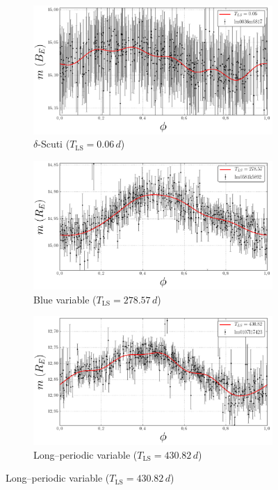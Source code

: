 \begin{figure}[H]
\begin{subfigure}[t]{0.49\textwidth}
	\end{subfigure}
	\begin{subfigure}[t]{0.49\textwidth}
		\centering
		\caption{$\delta$-Scuti ($T_{\text{LS}} = 0.06 \, \unit{d}$)}
		\label{fig:lightcurve-dsct}
		\includegraphics[width=\textwidth]{figures/lightcurves/dsct.png}		
	\end{subfigure}
	\begin{subfigure}[t]{0.49\textwidth}
		\centering
		\caption{Blue variable ($T_{\text{LS}} = 278.57 \, \unit{d}$)}
		\label{fig:lightcurve-bv}
		\includegraphics[width=\textwidth]{figures/lightcurves/bv.png}		
	\end{subfigure}
	\begin{subfigure}[t]{0.49\textwidth}
		\centering
		\caption{Long--periodic variable ($T_{\text{LS}} = 430.82 \, \unit{d}$)}
		\label{fig:lightcurve-lpv}
		\includegraphics[width=\textwidth]{figures/lightcurves/lpv.png}		

\end{subfigure}
\end{figure}
